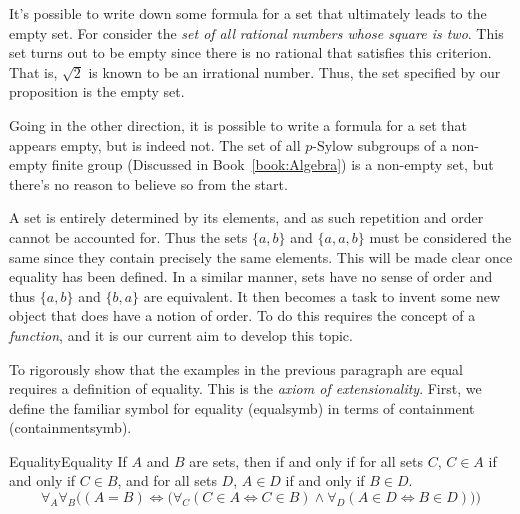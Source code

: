         \begin{example}
            It's possible to write down some formula for a set that ultimately
            leads to the empty set. For consider the \textit{set of all}
            \textit{rational numbers whose square is two}. This set turns out to
            be empty since there is no rational that satisfies this criterion.
            That is, $\sqrt{2}$ is known to be an irrational number. Thus, the
            set specified by our proposition is the empty set.
        \end{example}
        \begin{example}
            Going in the other direction, it is possible to write a formula for
            a set that appears empty, but is indeed not. The set of all
            $p\textrm{-Sylow}$ subgroups of a
            non-empty finite group (Discussed in Book~\ref{book:Algebra}) is a
            non-empty set, but there's no reason to believe so from the start.
        \end{example}
        A set is entirely determined by its elements, and as such repetition and
        order cannot be accounted for. Thus the sets $\{a,b\}$ and $\{a,a,b\}$
        must be considered the same since they contain precisely the same
        elements. This will be made clear once equality has been defined. In a
        similar manner, sets have no sense of order and thus $\{a,b\}$ and
        $\{b,a\}$ are equivalent. It then becomes a task to invent some new
        object that does have a notion of order. To do this requires the concept
        of a \textit{function}, and it is our current aim to
        develop this topic.
        \par\hfill\par
        To rigorously show that the examples in the previous paragraph are equal
        requires a definition of equality. This is the
        \textit{axiom of extensionality}. First,
        we define the familiar symbol for equality (\gls{equalsymb}) in
        terms of containment (\gls{containmentsymb}).
        \begin{fnotation}{Equality}{Equality}
            If $A$ and $B$ are sets, then  if and
            only if for all sets $C$, $C\in{A}$ if and only if $C\in{B}$, and
            for all sets $D$, $A\in{D}$ if and only if $B\in{D}$.
            \begin{equation*}
                \forall_{A}\forall_{B}\Big((A=B)\Longleftrightarrow\big(
                    \forall_{C}(C\in{A}\Leftrightarrow{C}\in{B})
                    \land\forall_{D}(A\in{D}\Leftrightarrow{B}\in{D})\big)\Big)
            \end{equation*}
        \end{fnotation}
